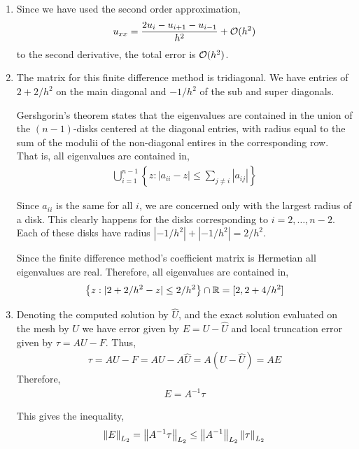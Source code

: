 \documentclass[10pt]{article}
\begin{document}
\begin{solution}[Solution]
\begin{enumerate}[label=(\alph*), nolistsep]
\item Since we have used the second order approximation,
\begin{align*}
    u_{xx} = \dfrac{2u_i - u_{i+1} - u_{i-1}}{h^2} + \mathcal{O}(h^2)
\end{align*}
to the second derivative, the total error is \( \mathcal{O}(h^2) \).
\item The matrix for this finite difference method is tridiagonal. We have entries of \( 2+2/h^2 \) on the main diagonal and \( -1/h^2 \) of the sub and super diagonals.

Gershgorin's theorem states that the eigenvalues are contained in the union of the \( (n-1) \)-disks centered at the diagonal entries, with radius equal to the sum of the modulii of the non-diagonal entires in the corresponding row. That is, all eigenvalues are contained in,
\begin{align*}
    \bigcup_{i=1}^{n-1} \left\{ z : |a_{ii}-z| \leq \sum_{j\neq i}| a_{ij}| \right\}
\end{align*}

Since \( a_{ii} \) is the same for all \( i \), we are concerned only with the largest radius of a disk. This clearly happens for the disks corresponding to \( i=2, \ldots, n-2 \). Each of these disks have radius \( |-1/h^2| + |-1/h^2| = 2/h^2 \).

Since the finite difference method's coefficient matrix is Hermetian all eigenvalues are real. Therefore, all eigenvalues are contained in,
\begin{align*}
\left\{ z: |2+2/h^2-z|\leq 2/h^2  \right\} \cap \mathbb{R} = [2,2+4/h^2 ]
\end{align*}
\item
Denoting the computed solution by \( \hat{U} \), and the exact solution evaluated on the mesh by \( U \) we have error given by \( E = U - \hat{U} \) and local truncation error given by \( \tau = AU-F \). Thus,
\begin{align*}
    \tau = AU - F = AU - A\hat{U} = A(U-\hat{U}) = AE
\end{align*}
Therefore,
\begin{align*}
    E = A^{-1}\tau
\end{align*}

This gives the inequality,
\begin{align*}
    \left\lVert E\right\rVert_{L_2} = \left\lVert A^{-1}\tau\right\rVert_{L_2} \leq \left\lVert A^{-1}\right\rVert_{L_2}\left\lVert\tau\right\rVert_{L_2}
\end{align*}


\end{enumerate}
\end{solution}
\end{document}

